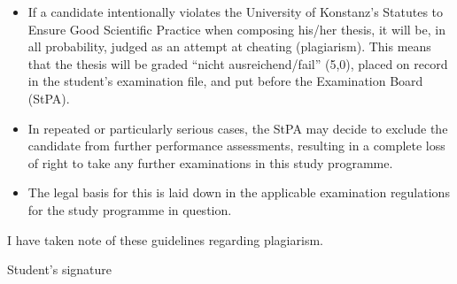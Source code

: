 {\begin{itemize}[label=\color{kon4}--, leftmargin=1.45cm, labelsep=0.45cm]
\item If a candidate intentionally violates the University of Konstanz's Statutes to Ensure Good Scientific Practice when composing his/her thesis, it will be, in all probability, judged as an attempt at cheating (plagiarism). This means that the thesis will be graded \enquote{nicht ausreichend/fail} (5,0), placed on record in the student's examination file, and put before the Examination Board (StPA).

\item In repeated or particularly serious cases, the StPA may decide to exclude the candidate from further performance assessments, resulting in a complete loss of right to take any further examinations in this study programme.

\item The legal basis for this is laid down in the applicable examination regulations for the study programme in question.
\end{itemize}

I have taken note of these guidelines regarding plagiarism.

\vspace{0.75cm}

\begin{minipage}{0.3\textwidth}


\end{minipage}\begin{minipage}{0.1\textwidth}
     \phantom{a}
\end{minipage}\begin{minipage}{0.6\textwidth}


    \raggedleft Student's signature
\end{minipage}
}
